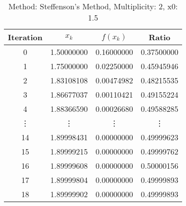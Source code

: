 \begin{table}
\centering
\caption{Method: Steffenson's Method, Multiplicity: 2, x0: 1.5}
\label{tab:table_Steffenson's_Method_2_1_5}
\begin{tabular}{c c c c}
\toprule
Iteration &      $x_k$ &   $f(x_k)$ &      Ratio \\
\midrule
        0 & 1.50000000 & 0.16000000 & 0.37500000 \\
        1 & 1.75000000 & 0.02250000 & 0.45945946 \\
        2 & 1.83108108 & 0.00474982 & 0.48215535 \\
        3 & 1.86677037 & 0.00110421 & 0.49155224 \\
        4 & 1.88366590 & 0.00026680 & 0.49588285 \\
   \vdots &     \vdots &     \vdots &     \vdots \\
       14 & 1.89998431 & 0.00000000 & 0.49999623 \\
       15 & 1.89999215 & 0.00000000 & 0.49999762 \\
       16 & 1.89999608 & 0.00000000 & 0.50000156 \\
       17 & 1.89999804 & 0.00000000 & 0.49999893 \\
       18 & 1.89999902 & 0.00000000 & 0.49999893 \\
\bottomrule
\end{tabular}
\end{table}
